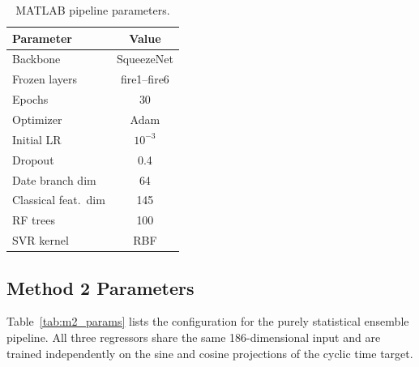 \documentclass[9pt, a4paper, twocolumn]{article}
\begin{document}
\begin{table}[H]
\centering
\footnotesize
\caption{MATLAB pipeline parameters.}
\label{tab:matlab_params}
\begin{tabular}{lc}
\toprule
\textbf{Parameter} & \textbf{Value} \\
\midrule
Backbone            & SqueezeNet \\
Frozen layers       & fire1--fire6 \\
Epochs              & 30 \\
Optimizer           & Adam \\
Initial LR          & $10^{-3}$ \\
Dropout             & 0.4 \\
Date branch dim     & 64 \\
Classical feat.\ dim & 145 \\
RF trees            & 100 \\
SVR kernel          & RBF \\
\bottomrule
\end{tabular}
\end{table}

\subsection{Method 2 Parameters}

Table~\ref{tab:m2_params} lists the configuration for the purely
statistical ensemble pipeline. All three regressors share the same
186-dimensional input and are trained independently on the sine and cosine
projections of the cyclic time target.
\end{document}
